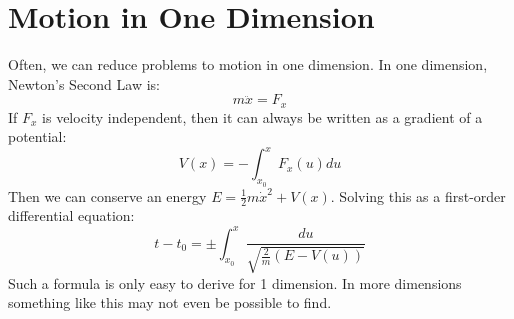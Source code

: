 \documentclass[../Main.tex]{subfiles}
\begin{document}
\section{Motion in One Dimension}
Often, we can reduce problems to motion in one dimension. In one dimension, Newton's Second Law is:
\begin{equation}
    m\ddot{x} = F_x
    \label{eqnNewtonSecondOneDim}
\end{equation}
If $F_x$ is velocity independent, then it can always be written as a gradient of a potential:
\begin{equation}
    V(x) = -\int_{x_0}^{x} F_x(u) du
    \label{eqnPotentialOneDim}
\end{equation}
Then we can conserve an energy $E = \frac{1}{2} m \dot{x}^2 + V(x)$. Solving this as a first-order differential equation:
\begin{equation}
    t - t_0 = \pm \int_{x_0}^x \frac{du}{\sqrt{\frac{2}{m}\left(E - V(u)\right)}}
    \label{eqnTimeGivenEnergy}
\end{equation}
Such a formula is only easy to derive for 1 dimension. In more dimensions something like this may not even be possible to find.
\end{document}

